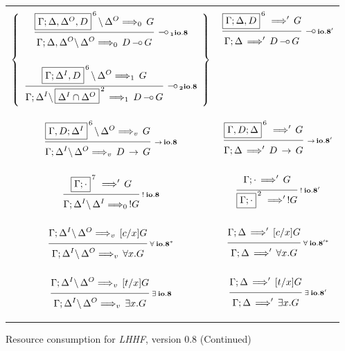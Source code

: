 \clearpage
\begin{figure}[t]
  \begin{center}
    \leavevmode

    \begin{tabular}{|c|c|}
      \hline &\\

      $\left\{
        \begin{array}{c}
          \ruleI
            {\ioVIII{\fb{\G;\D,\D^O,D}{6}}{\D^O}{G}{0}}
            {\ioVIII{\G;\D,\D^O}{\D^O}{D \Lolli G}{0}}
            {\Lolli_1 io.8}
        \\ \\
          \ruleI
            {\ioVIII{\fb{\G;\D^I,D}{6}}{\D^O}{G}{1}}
            {\ioVIII{\G;\D^I}{\fb{\D^I \cap \D^O}{2}}{D \Lolli G}{1}}
            {\Lolli_2 io.8}
        \end{array}
      \right\}$
      &
      $\ruleI
        {\ioVIIIa{\fb{\G;\D,D}{6}}{G}}
        {\ioVIIIa{\G;\D}{D \Lolli G}}
        {\Lolli io.8'}$
      \\&\\&\\

      $\ruleI
        {\ioVIII{\fb{\G,D;\D^I}{6}}{\D^O}{G}{v}}
        {\ioVIII{\G;\D^I}{\D^O}{D \Imp G}{v}}
        {\Imp io.8}$
      &
      $\ruleI
        {\ioVIIIa{\fb{\G,D;\D}{6}}{G}}
        {\ioVIIIa{\G;\D}{D \Imp G}}
        {\Imp io.8'}$
      \\&\\&\\

      $\ruleI
        {\ioVIIIa{\fb{\G;\cdot}{7}}{G}}
        {\ioVIII{\G;\D^I}{\D^I}{!G}{0}}
        {! \: io.8}$
      &
      $\ruleI
        {\ioVIIIa{\G;\cdot}{G}}
        {\ioVIIIa{\fb{\G;\cdot}{2}}{!G}}
        {! \: io.8'}$
      \\&\\&\\

      $\ruleI
        {\ioVIII{\G;\D^I}{\D^O}{[c/x]G}{v}}
        {\ioVIII{\G;\D^I}{\D^O}{\A x. G}{v}}
        {\A \: io.8^*}$
      &
      $\ruleI
        {\ioVIIIa{\G;\D}{[c/x]G}}
        {\ioVIIIa{\G;\D}{\A x. G}}
        {\A \: io.8'^*}$
      \\&\\&\\

      $\ruleI
        {\ioVIII{\G;\D^I}{\D^O}{[t/x]G}{v}}
        {\ioVIII{\G;\D^I}{\D^O}{\E x. G}{v}}
        {\E \: io.8}$
      &
      $\ruleI
        {\ioVIIIa{\G;\D}{[t/x]G}}
        {\ioVIIIa{\G;\D}{\E x. G}}
        {\E \: io.8'}$
      \\&\\
      \hline
    \end{tabular}

    \caption{Resource consumption for {\em LHHF}, version 0.8 (Continued)}
    \label{fig:RC_VIII3}
  \end{center}
\end{figure}
\hspace*{1em}


